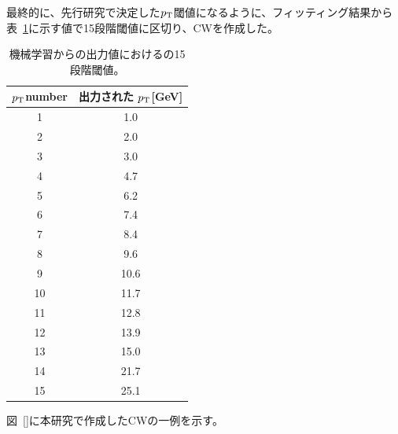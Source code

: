 最終的に、先行研究\cite{article:shiomi-mron}で決定した$p_{\rm{T}}$閾値になるように、フィッティング結果から表~\ref{Effective_number}に示す値で15段階閾値に区切り、CWを作成した。
\begin{table}[thb]
\centering
    \caption{機械学習からの出力値におけるの15段階閾値。}
    \label{Effective_number}
    \begin{tabular}{|c|c|}
        \hline
        $p_{\rm{T}}$number & 出力された $p_{\rm{T}}$[GeV]\\
        \hline
        1 & 1.0\\
        \hline
        2 & 2.0\\
        \hline
        3 & 3.0\\
        \hline
        4 & 4.7\\
        \hline
        5 & 6.2\\
        \hline
        6 & 7.4\\
        \hline
        7 & 8.4\\
        \hline
        8 & 9.6\\
        \hline
        9 & 10.6\\
        \hline
        10 & 11.7\\
        \hline
        11 & 12.8\\
        \hline
        12 & 13.9\\
        \hline
        13 & 15.0\\
        \hline
        14 & 21.7\\
        \hline
        15 & 25.1\\
        \hline
        
    \end{tabular}
\end{table}

図~\ref{}に本研究で作成したCWの一例を示す。




